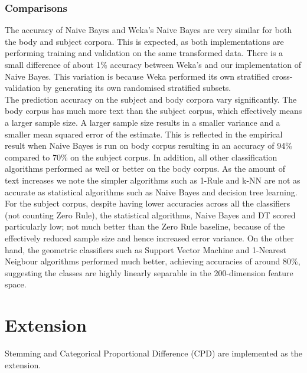 \documentclass[12pt]{article}
\begin{document}
\subsubsection{Comparisons}
The accuracy of Naive Bayes and Weka's Naive Bayes are very similar for both the body and subject corpora. This is expected, as both implementations are performing training and validation on the same transformed data. There is a small difference of about 1\% accuracy between Weka's and our implementation of Naive Bayes. This variation is because Weka performed its own stratified cross-validation by generating its own randomised stratified subsets.\\

The prediction accuracy on the subject and body corpora vary significantly. The body corpus has much more text than the subject corpus, which effectively means a larger sample size. A larger sample size results in a smaller variance and a smaller mean squared error of the estimate. This is reflected in the empirical result when Naive Bayes is run on body corpus resulting in an accuracy of 94\% compared to 70\% on the subject corpus. In addition, all other classification algorithms performed as well or better on the body corpus. As the amount of text increases we note the simpler algorithms such as 1-Rule and k-NN are not as accurate as statistical algorithms such as Naive Bayes and decision tree learning. \\

For the subject corpus, despite having lower accuracies across all the classifiers (not counting Zero Rule), the statistical algorithms, Naive Bayes and DT scored particularly low; not much better than the Zero Rule baseline, because of the effectively reduced sample size and hence increased error variance. On the other hand, the geometric classifiers such as Support Vector Machine and 1-Nearest Neigbour algorithms performed much better, achieving accuracies of around 80\%, suggesting the classes are highly linearly separable in the 200-dimension feature space. \\
\section{Extension}
Stemming and Categorical Proportional Difference (CPD) are implemented as the extension. 
\end{document}
